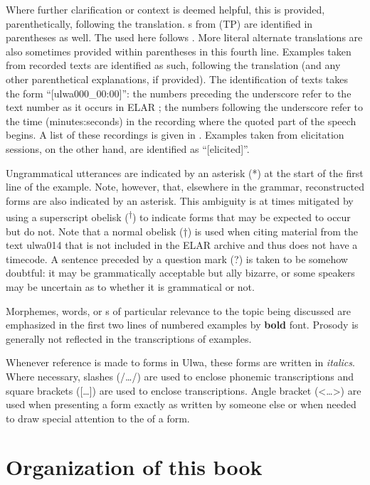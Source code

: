 Where further clarification or context is deemed helpful, this is provided, parenthetically, following the translation. s from  (TP) are identified in parentheses as well. The   used here follows \citet{Volker2008}. More literal alternate translations are also sometimes provided within parentheses in this fourth line. Examples taken from recorded texts are identified as such, following the  translation (and any other parenthetical explanations, if provided). The identification of texts takes the form “[ulwa000\_00:00]”: the numbers preceding the underscore refer to the text number as it occurs in ELAR \citep{Barlow2018b}; the numbers following the underscore refer to the time (minutes:seconds) in the recording where the quoted part of the speech begins. A list of these recordings is given in . Examples taken from elicitation sessions, on the other hand, are identified as “[elicited]”.

Ungrammatical utterances are indicated by an asterisk (*) at the start of the first line of the example. Note, however, that, elsewhere in the grammar, reconstructed forms are also indicated by an asterisk. This ambiguity is at times mitigated by using a superscript obelisk (\textsuperscript{†}) to indicate forms that may be expected to occur but do not. Note that a normal obelisk (†) is used when citing material from the text ulwa014 that is not included in the ELAR archive and thus does not have a timecode. A sentence preceded by a  question mark (?) is taken to be somehow doubtful: it may be grammatically acceptable but ally bizarre, or some speakers may be uncertain as to whether it is grammatical or not.

Morphemes, words, or s of particular relevance to the topic being discussed are emphasized in the first two lines of numbered examples by \textbf{bold} font. Prosody is generally not reflected in the transcriptions of examples.


  Whenever reference is made to forms in Ulwa, these forms are written in \textit{italics}. Where necessary, slashes (/…/) are used to enclose phonemic transcriptions and square brackets ([…]) are used to enclose  transcriptions. Angle bracket (<…>) are used when presenting a form exactly as written by someone else or when needed to draw special attention to the  of a form.

\section{Organization of this book}\label{sec:1.4.1}


